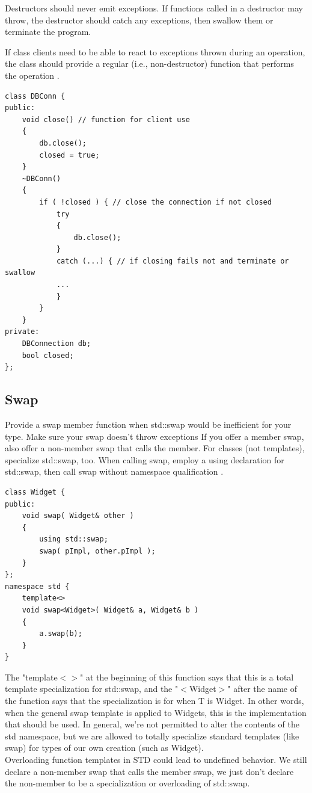 \documentclass[a4paper,12pt,notitlepage]{article}
\begin{document}
Destructors should never emit exceptions. If functions called in a destructor may throw, the
destructor should catch any exceptions, then swallow them or terminate the program.

If class clients need to be able to react to exceptions thrown during an operation, the class should
provide a regular (i.e., non-destructor) function that performs the operation \cite{Meyers_eff}.

\begin{verbatim}
class DBConn {
public:
    void close() // function for client use
    {
        db.close();
        closed = true;
    }
    ~DBConn()
    {
        if ( !closed ) { // close the connection if not closed
            try
            {
                db.close();
            }
            catch (...) { // if closing fails not and terminate or swallow
            ...
            }
        }
    }
private:
    DBConnection db;
    bool closed;
};
\end{verbatim}


\subsection{Swap}

Provide a swap member function when std::swap would be inefficient for your type. Make sure your
swap doesn't throw exceptions If you offer a member swap, also offer a non-member swap that calls
the member. For classes (not templates), specialize std::swap, too. When calling swap, employ a
using declaration for std::swap, then call swap without namespace qualification \cite{Meyers_eff}.

\begin{verbatim}
class Widget {
public:
    void swap( Widget& other )
    {
        using std::swap;
        swap( pImpl, other.pImpl );
    }
};
namespace std {
    template<>
    void swap<Widget>( Widget& a, Widget& b )
    {
        a.swap(b);
    }
}
\end{verbatim}

The "template$<>$" at the beginning of this function says that this is a total template specialization
for std::swap, and the "$<$Widget$>$" after the name of the function says that the specialization is for
when T is Widget. In other words, when the general swap template is applied to Widgets, this is the
implementation that should be used. In general, we're not permitted to alter the contents of the std
namespace, but we are allowed to totally specialize standard templates (like swap) for types of our
own creation (such as Widget). \\
Overloading function templates in STD could lead to undefined behavior. We still declare a non-member
swap that calls the member swap, we just don't declare the non-member to be a specialization or overloading
of std::swap.
\end{document}
